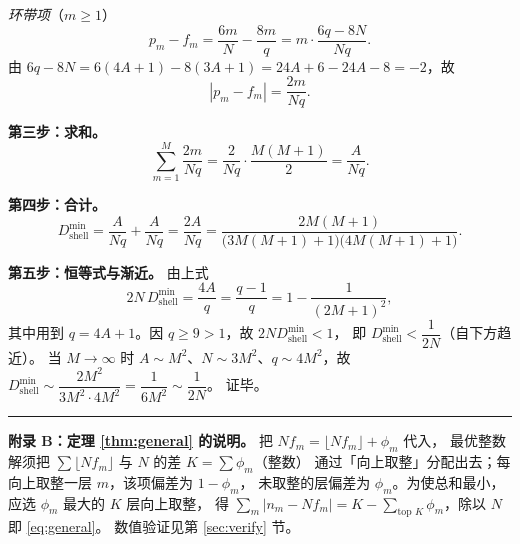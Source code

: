 \documentclass[12pt, a4paper]{ctexart}
\begin{document}
\emph{环带项}（$m\ge1$）
\begin{equation}
p_m - f_m = \frac{6m}{N}-\frac{8m}{q}
= m\cdot\frac{6q-8N}{Nq}.
\end{equation}
由 $6q-8N = 6(4A+1)-8(3A+1) = 24A+6-24A-8 = -2$，故
\begin{equation}
\left|p_m-f_m\right| = \frac{2m}{Nq}.
\end{equation}

\vspace{4pt}
\textbf{第三步：求和。}
\begin{equation}
\sum_{m=1}^{M}\frac{2m}{Nq}
= \frac{2}{Nq}\cdot\frac{M(M+1)}{2}
= \frac{A}{Nq}.
\end{equation}

\vspace{4pt}
\textbf{第四步：合计。}
\begin{equation}
D_{\mathrm{shell}}^{\min}
= \frac{A}{Nq} + \frac{A}{Nq}
= \frac{2A}{Nq}
= \frac{2M(M+1)}{\big(3M(M+1)+1\big)\big(4M(M+1)+1\big)} .
\end{equation}

\vspace{4pt}
\textbf{第五步：恒等式与渐近。} 由上式
\begin{equation}
2N\,D_{\mathrm{shell}}^{\min} = \frac{4A}{q} = \frac{q-1}{q} = 1-\frac{1}{(2M+1)^2},
\end{equation}
其中用到 $q = 4A+1$。因 $q\ge9>1$，故 $2N D_{\mathrm{shell}}^{\min}<1$，
即 $D_{\mathrm{shell}}^{\min} < \dfrac{1}{2N}$（自下方趋近）。
当 $M\to\infty$ 时 $A\sim M^2$、$N\sim3M^2$、$q\sim4M^2$，故
$D_{\mathrm{shell}}^{\min}\sim\dfrac{2M^2}{3M^2\cdot4M^2}=\dfrac{1}{6M^2}\sim\dfrac{1}{2N}$。
证毕。

\vspace{6pt}
\hrule
\vspace{6pt}

\textbf{附录 B：定理 \ref{thm:general} 的说明。}
把 $Nf_m = \lfloor Nf_m\rfloor + \phi_m$ 代入，
最优整数解须把 $\sum \lfloor Nf_m\rfloor$ 与 $N$ 的差 $K=\sum\phi_m$（整数）
通过「向上取整」分配出去；每向上取整一层 $m$，该项偏差为 $1-\phi_m$，
未取整的层偏差为 $\phi_m$。为使总和最小，应选 $\phi_m$ 最大的 $K$ 层向上取整，
得 $\sum_m|n_m-Nf_m| = K - \sum_{\text{top }K}\phi_m$，除以 $N$ 即 \eqref{eq:general}。
数值验证见第 \ref{sec:verify} 节。
\end{document}
